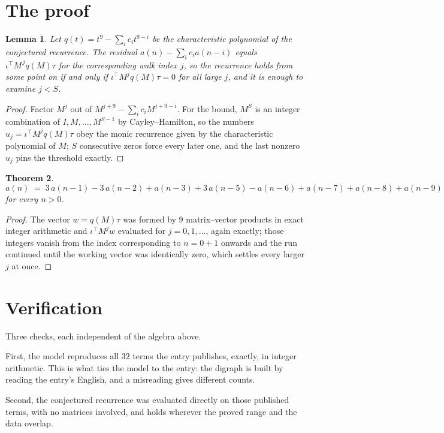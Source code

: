 \documentclass[11pt,a4paper]{article}
\theoremstyle{plain}
\newtheorem{theorem}{Theorem}
\newtheorem{lemma}[theorem]{Lemma}
\theoremstyle{definition}
\begin{document}
\section{The proof}

\begin{lemma}\label{lem:crit}
Let $q(t)=t^{9}-\sum_i c_it^{9-i}$ be the characteristic polynomial of the
conjectured recurrence. The residual $a(n)-\sum_ic_ia(n-i)$ equals
$\iota^{\!\top}M^{\,j}q(M)\tau$ for the corresponding walk index $j$, so the recurrence
holds from some point on if and only if $\iota^{\!\top}M^{j}q(M)\tau=0$ for all large $j$,
and it is enough to examine $j<S$.
\end{lemma}

\begin{proof}
Factor $M^{j}$ out of $M^{j+9}-\sum_ic_iM^{j+9-i}$. For the bound, $M^{S}$
is an integer combination of $I,M,\dots,M^{S-1}$ by Cayley--Hamilton, so the numbers
$u_j=\iota^{\!\top}M^{j}q(M)\tau$ obey the monic recurrence given by the characteristic
polynomial of $M$; $S$ consecutive zeros force every later one, and the last nonzero $u_j$
pins the threshold exactly.
\end{proof}

\begin{theorem}
\[
a(n)\;=\;3\,a(n-1) - 3\,a(n-2) + a(n-3) + 3\,a(n-5) - a(n-6) + a(n-7) + a(n-8) + a(n-9)
\]
for every $n>0$.
\end{theorem}

\begin{proof}
The vector $w=q(M)\tau$ was formed by $9$ matrix--vector products in exact integer
arithmetic and $\iota^{\!\top}M^{j}w$ evaluated for $j=0,1,\dots$, again exactly; those
integers vanish from the index corresponding to $n=0+1$ onwards and the run continued
until the working vector was identically zero, which settles every larger $j$ at once.
\end{proof}

\section{Verification}

Three checks, each independent of the algebra above.

First, the model reproduces all $32$ terms the entry publishes, exactly, in integer
arithmetic. This is what ties the model to the entry: the digraph is built by reading the
entry's English, and a misreading gives different counts.

Second, the conjectured recurrence was evaluated directly on those published terms, with no
matrices involved, and holds wherever the proved range and the data overlap.
\end{document}
